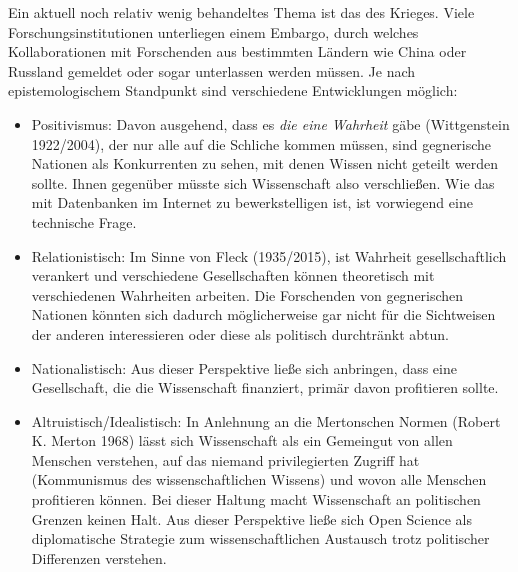 \documentclass[
  letterpaper,
  DIV=11,
  numbers=noendperiod]{scrreprt}
\begin{document}
\begin{tcolorbox}[enhanced jigsaw, title=\textcolor{quarto-callout-tip-color}{\faLightbulb}\hspace{0.5em}{Krieg und Open Science}, colbacktitle=quarto-callout-tip-color!10!white, rightrule=.15mm, titlerule=0mm, left=2mm, bottomrule=.15mm, arc=.35mm, leftrule=.75mm, toprule=.15mm, opacityback=0, breakable, bottomtitle=1mm, colframe=quarto-callout-tip-color-frame, toptitle=1mm, opacitybacktitle=0.6, coltitle=black, colback=white]

Ein aktuell noch relativ wenig behandeltes Thema ist das des Krieges.
Viele Forschungsinstitutionen unterliegen einem Embargo, durch welches
Kollaborationen mit Forschenden aus bestimmten Ländern wie China oder
Russland gemeldet oder sogar unterlassen werden müssen. Je nach
epistemologischem Standpunkt sind verschiedene Entwicklungen möglich:

\begin{itemize}
\item
  Positivismus: Davon ausgehend, dass es \emph{die eine Wahrheit} gäbe
  (Wittgenstein 1922/2004), der nur alle auf die Schliche kommen müssen,
  sind gegnerische Nationen als Konkurrenten zu sehen, mit denen Wissen
  nicht geteilt werden sollte. Ihnen gegenüber müsste sich Wissenschaft
  also verschließen. Wie das mit Datenbanken im Internet zu
  bewerkstelligen ist, ist vorwiegend eine technische Frage.
\item
  Relationistisch: Im Sinne von Fleck (1935/2015), ist Wahrheit
  gesellschaftlich verankert und verschiedene Gesellschaften können
  theoretisch mit verschiedenen Wahrheiten arbeiten. Die Forschenden von
  gegnerischen Nationen könnten sich dadurch möglicherweise gar nicht
  für die Sichtweisen der anderen interessieren oder diese als politisch
  durchtränkt abtun.
\item
  Nationalistisch: Aus dieser Perspektive ließe sich anbringen, dass
  eine Gesellschaft, die die Wissenschaft finanziert, primär davon
  profitieren sollte.
\item
  Altruistisch/Idealistisch: In Anlehnung an die Mertonschen Normen
  (Robert K. Merton 1968) lässt sich Wissenschaft als ein Gemeingut von
  allen Menschen verstehen, auf das niemand privilegierten Zugriff hat
  (Kommunismus des wissenschaftlichen Wissens) und wovon alle Menschen
  profitieren können. Bei dieser Haltung macht Wissenschaft an
  politischen Grenzen keinen Halt. Aus dieser Perspektive ließe sich
  Open Science als diplomatische Strategie zum wissenschaftlichen
  Austausch trotz politischer Differenzen verstehen.
\end{itemize}


\end{tcolorbox}
\end{document}
